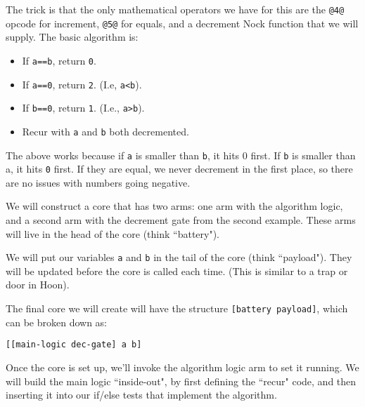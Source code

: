\documentclass[twoside]{article}
\begin{document}
The trick is that the only mathematical operators we have for this are the \lstinline[style=inlinecode]{@4@} opcode for increment, \lstinline[style=inlinecode]{@5@} for equals, and a decrement Nock function that we will supply.  The basic algorithm is:

\begin{itemize}
  \item  If \lstinline[style=inlinecode]{a==b}, return \lstinline[style=inlinecode]{0}.
  \item  If \lstinline[style=inlinecode]{a==0}, return \lstinline[style=inlinecode]{2}.  (I.e, \lstinline[style=inlinecode]{a<b}).
  \item  If \lstinline[style=inlinecode]{b==0}, return \lstinline[style=inlinecode]{1}.  (I.e., \lstinline[style=inlinecode]{a>b}).
  \item  Recur with \lstinline[style=inlinecode]{a} and \lstinline[style=inlinecode]{b} both decremented.
\end{itemize}

The above works because if \lstinline[style=inlinecode]{a} is smaller than \lstinline[style=inlinecode]{b}, it hits 0 first. If \lstinline[style=inlinecode]{b} is smaller than a, it hits \lstinline[style=inlinecode]{0} first. If they are equal, we never decrement in the first place, so there are no issues with numbers going negative.

We will construct a core that has two arms: one arm with the algorithm logic, and a second arm with the decrement gate from the second example. These arms will live in the head of the core (think ``battery").

We will put our variables \lstinline[style=inlinecode]{a} and \lstinline[style=inlinecode]{b} in the tail of the core (think ``payload"). They will be updated before the core is called each time. (This is similar to a trap or door in Hoon).

The final core we will create will have the structure \lstinline[style=inlinecode]{[battery payload]}, which can be broken down as:

\begin{lstlisting}[style=listingblock]
[[main-logic dec-gate] a b]
\end{lstlisting}

Once the core is set up, we'll invoke the algorithm logic arm to set it running.  We will build the main logic ``inside-out", by first defining the ``recur" code, and then inserting it into our if/else tests that implement the algorithm.
\end{document}
